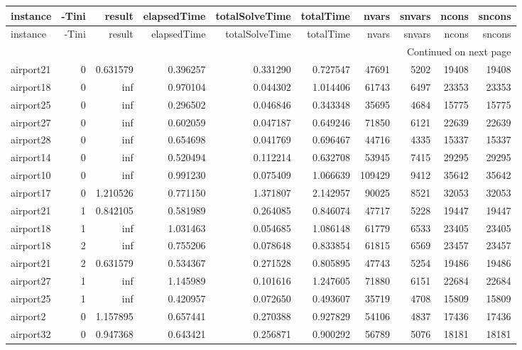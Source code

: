 
\begin{longtable}{|l|r|r|r|r|r|r|r|r|r|}
\toprule
instance & -Tini & result & elapsedTime & totalSolveTime & totalTime & nvars & snvars & ncons & sncons \\
\midrule
\endfirsthead
\toprule
instance & -Tini & result & elapsedTime & totalSolveTime & totalTime & nvars & snvars & ncons & sncons \\
\midrule
\endhead
\midrule
\multicolumn{10}{r}{Continued on next page} \\
\midrule
\endfoot
\bottomrule
\endlastfoot
airport21 & 0 & 0.631579 & 0.396257 & 0.331290 & 0.727547 & 47691 & 5202 & 19408 & 19408 \\
airport18 & 0 & inf & 0.970104 & 0.044302 & 1.014406 & 61743 & 6497 & 23353 & 23353 \\
airport25 & 0 & inf & 0.296502 & 0.046846 & 0.343348 & 35695 & 4684 & 15775 & 15775 \\
airport27 & 0 & inf & 0.602059 & 0.047187 & 0.649246 & 71850 & 6121 & 22639 & 22639 \\
airport28 & 0 & inf & 0.654698 & 0.041769 & 0.696467 & 44716 & 4335 & 15337 & 15337 \\
airport14 & 0 & inf & 0.520494 & 0.112214 & 0.632708 & 53945 & 7415 & 29295 & 29295 \\
airport10 & 0 & inf & 0.991230 & 0.075409 & 1.066639 & 109429 & 9412 & 35642 & 35642 \\
airport17 & 0 & 1.210526 & 0.771150 & 1.371807 & 2.142957 & 90025 & 8521 & 32053 & 32053 \\
airport21 & 1 & 0.842105 & 0.581989 & 0.264085 & 0.846074 & 47717 & 5228 & 19447 & 19447 \\
airport18 & 1 & inf & 1.031463 & 0.054685 & 1.086148 & 61779 & 6533 & 23405 & 23405 \\
airport18 & 2 & inf & 0.755206 & 0.078648 & 0.833854 & 61815 & 6569 & 23457 & 23457 \\
airport21 & 2 & 0.631579 & 0.534367 & 0.271528 & 0.805895 & 47743 & 5254 & 19486 & 19486 \\
airport27 & 1 & inf & 1.145989 & 0.101616 & 1.247605 & 71880 & 6151 & 22684 & 22684 \\
airport25 & 1 & inf & 0.420957 & 0.072650 & 0.493607 & 35719 & 4708 & 15809 & 15809 \\
airport2 & 0 & 1.157895 & 0.657441 & 0.270388 & 0.927829 & 54106 & 4837 & 17436 & 17436 \\
airport32 & 0 & 0.947368 & 0.643421 & 0.256871 & 0.900292 & 56789 & 5076 & 18181 & 18181 \\

\end{longtable}
